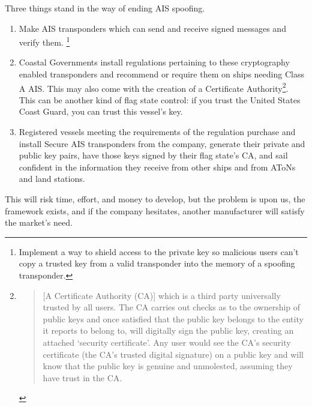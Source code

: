\documentclass[12pt]{texMemo} %
\begin{document}
Three things stand in the way of ending AIS spoofing. \begin{enumerate}
    \item Make AIS transponders which can send and receive signed messages and verify them. \footnote{Implement a way to shield access to the private key so malicious users can't copy a trusted key from a valid transponder into the memory of a spoofing transponder.}
    \item Coastal Governments install regulations pertaining to these cryptography enabled transponders and recommend or require them on ships needing Class A AIS. This may also come with the creation of a Certificate Authority\footnote{\begin{quote}
        [A Certificate Authority (CA)] which is a third party universally trusted by all users. The CA carries out checks as to the ownership of public keys and once satisfied that the public key belongs to the entity it reports to belong to, will digitally sign the public key, creating an attached ‘security certificate’. Any user would see the CA’s security certificate (the CA’s trusted digital signature) on a public key and will know that the public key is genuine and unmolested, assuming they have trust in the CA. \parencite[p 343]{wimpenny_securing_2022}
    \end{quote} }. This can be another kind of flag state control: if you trust the United States Coast Guard, you can trust this vessel's key.
    \item Registered vessels meeting the requirements of the regulation purchase and install Secure AIS transponders from the company, generate their private and public key pairs, have those keys signed by their flag state's CA, and sail confident in the information they receive from other ships and from AToNs and land stations.
\end{enumerate}

This will risk time, effort, and money to develop, but the problem is upon us, the framework exists, and if the company hesitates, another manufacturer will satisfy the market's need.
\newpage
\end{document}
